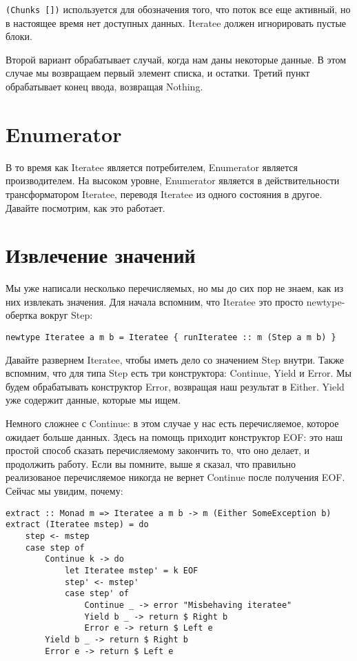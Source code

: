 \lstinline'(Chunks [])' используется для обозначения того, что поток все еще активный, но в настоящее время нет доступных данных. Iteratee должен игнорировать пустые блоки.

Второй вариант обрабатывает случай, когда нам даны некоторые данные. В этом случае мы возвращаем первый элемент списка, и остатки. Третий пункт обрабатывает конец ввода, возвращая Nothing.

\section{Enumerator}

В то время как Iteratee является потребителем, Enumerator является производителем. На высоком уровне, Enumerator является в действительности трансформатором Iteratee, переводя Iteratee из одного состояния в другое. Давайте посмотрим, как это работает.

\section{Извлечение значений}

Мы уже написали несколько перечисляемых, но мы до сих пор не знаем, как из них извлекать значения. Для начала вспомним, что Iteratee это просто newtype-обертка вокруг Step:

\begin{lstlisting}
newtype Iteratee a m b = Iteratee { runIteratee :: m (Step a m b) }
\end{lstlisting}

Давайте развернем Iteratee, чтобы иметь дело со значением Step внутри. Также вспомним, что для типа Step есть три конструктора: Continue, Yield и Error. Мы будем обрабатывать конструктор Error, возвращая наш результат в Either. Yield уже содержит данные, которые мы ищем.

Немного сложнее с Continue: в этом случае у нас есть перечисляемое, которое ожидает больше данных. Здесь на помощь приходит конструктор EOF: это наш простой способ сказать перечисляемому закончить то, что оно делает, и продолжить работу. Если вы помните, выше я сказал, что правильно реализованое перечисляемое никогда не вернет Continue после получения EOF. Сейчас мы увидим, почему:

\begin{lstlisting}
extract :: Monad m => Iteratee a m b -> m (Either SomeException b)
extract (Iteratee mstep) = do
    step <- mstep
    case step of
        Continue k -> do
            let Iteratee mstep' = k EOF
            step' <- mstep'
            case step' of
                Continue _ -> error "Misbehaving iteratee"
                Yield b _ -> return $ Right b
                Error e -> return $ Left e
        Yield b _ -> return $ Right b
        Error e -> return $ Left e
\end{lstlisting}%

